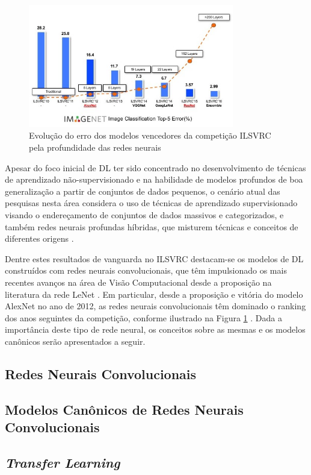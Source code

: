 \begin{figure}[ht]
	\centering
	\caption{Evolução do erro dos modelos vencedores da competição ILSVRC pela profundidade das redes neurais \cite{dl_ILSVRC, ImagenetChall}}
	\label{fig:compara_redes_ilsvrc}
	\includegraphics[width=0.8\textwidth]{img/compara_redes_ilsvrc.png}
\end{figure}

Apesar do foco inicial de DL ter sido concentrado no desenvolvimento de técnicas de aprendizado não-supervisionado e na habilidade de modelos profundos de boa generalização a partir de conjuntos de dados pequenos, o cenário atual das pesquisas nesta área considera o uso de técnicas de aprendizado supervisionado visando o endereçamento de conjuntos de dados massivos e categorizados, e também redes neurais profundas híbridas, que misturem técnicas e conceitos de diferentes origens \cite{deng2014deep,goodfellow2016deep}.

Dentre estes resultados de vanguarda no ILSVRC destacam-se os modelos de DL construídos com redes neurais convolucionais, que têm impulsionado os mais recentes avanços na área de Visão Computacional desde a proposição na literatura da rede LeNet \cite{lenet}. Em particular, desde a proposição e vitória do modelo AlexNet \cite{alexnet} no ano de 2012, as redes neurais convolucionais têm dominado o ranking dos anos seguintes da competição, conforme ilustrado na Figura \ref{fig:compara_redes_ilsvrc} \cite{deng2014deep}. Dada a importância deste tipo de rede neural, os conceitos sobre as mesmas e os modelos canônicos serão apresentados a seguir.


\subsection{Redes Neurais Convolucionais} \label{subsubsec:rnc}


\subsection{Modelos Canônicos de Redes Neurais Convolucionais} \label{subsubsec:modelos_canonicos}


\subsection{\emph{Transfer Learning}}

